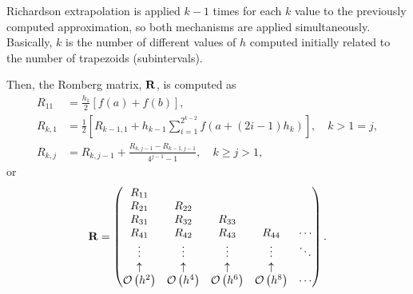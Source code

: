 Richardson extrapolation is applied $k-1$ times for each $k$ value to the previously
computed approximation, so both mechanisms are applied simultaneously.
Basically, $k$ is the number of different values of $h$ computed initially related
to the number of trapezoids (subintervals).

Then, the Romberg matrix, $\boldsymbol{\mathrm{R}}$, is computed as
\begin{align}
    R_{11} &= \frac{h_1}{2} \left[ f\left( a \right) + f\left( b \right) \right], \\
    R_{k,1} &= \frac{1}{2} \left[ R_{k-1,1} + h_{k-1} \sum_{i = 1}^{2^{k-2}} f\left( a + \left( 2i - 1 \right)h_k \right) \right], \quad k>1=j, \\
    R_{k,j} &= R_{k,j-1} + \frac{ R_{k,j-1} - R_{k-1,j-1} }{4^{j-1} - 1}, \quad k\ge j > 1,
\end{align}
or 
\begin{equation}
    \boldsymbol{\mathrm{R}} = 
    \begin{pmatrix}
        R_{11} & & & & \\
        R_{21} & R_{22} & & & \\
        R_{31} & R_{32} & R_{33} & & \\
        R_{41} & R_{42} & R_{43} & R_{44} & \cdots \\
        \vdots & \vdots & \vdots & \vdots & \ddots \\
        \uparrow & \uparrow & \uparrow & \uparrow &  \\
        \mathcal{O} \left( h^{2} \right) & \mathcal{O} \left( h^{4} \right) & \mathcal{O} \left( h^{6} \right) & \mathcal{O} \left( h^{8} \right) & \cdots \\
    \end{pmatrix}.
\end{equation}

